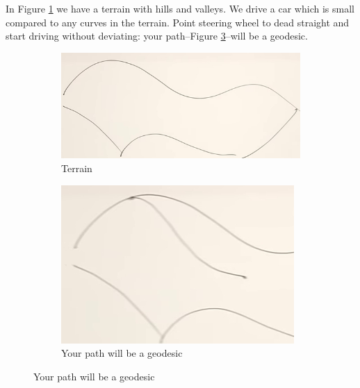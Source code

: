 \documentclass[]{article}
\begin{document}
{In Figure \ref{fig:gr-4-geodesic-intuition} we have a terrain with hills and valleys. We drive a car which is small compared to any curves in the terrain. Point steering wheel to dead straight and start driving without deviating: your path--Figure \ref{fig:gr-4-geodesic-intuition-path}--will be a geodesic.
\begin{figure}[H]
	\begin{center}
		\caption{Intuition for geodesics}
		\begin{subfigure}{0.45\textwidth}
			\caption{Terrain}\label{fig:gr-4-geodesic-intuition}
			\includegraphics[width=\textwidth]{gr-4-geodesic-intuition}
		\end{subfigure}
		\begin{subfigure}{0.45\textwidth}
			\caption{Your path will be a geodesic}\label{fig:gr-4-geodesic-intuition-path}
			\includegraphics[width=\textwidth]{gr-4-geodesic-intuition-path}
		\end{subfigure}
	\end{center}
\end{figure} 

}
\end{document}
